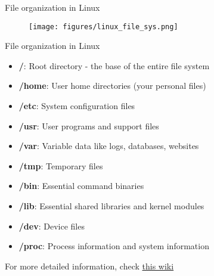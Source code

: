 \begin{frame}[fragile]{File organization in Linux}
	\begin{figure}
		\begin{center}
			\texttt{[image: figures/linux\_file\_sys.png]}
		\end{center}
	\end{figure}
	
\end{frame}

\begin{frame}[fragile]{File organization in Linux}
	\begin{itemize}
		\item \textbf{/}: Root directory - the base of the entire file system
		\item \textbf{/home}: User home directories (your personal files)
		\item \textbf{/etc}: System configuration files
		\item \textbf{/usr}: User programs and support files
		\item \textbf{/var}: Variable data like logs, databases, websites
		\item \textbf{/tmp}: Temporary files
		\item \textbf{/bin}: Essential command binaries
		\item \textbf{/lib}: Essential shared libraries and kernel modules
		\item \textbf{/dev}: Device files
		\item \textbf{/proc}: Process information and system information
	\end{itemize}

	For more detailed information, check \href{https://en.wikipedia.org/wiki/Filesystem_Hierarchy_Standard}{this wiki}
\end{frame}

